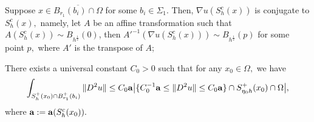 \documentclass[10pt,a4paper]{amsart}
\begin{document}
	\begin{corollary}\label{nonconvpart}
		Suppose $x\in \overline{B_{r_1}(b_i)\cap \Omega}$ for some $b_i\in \Sigma_1.$ Then,
		$\nabla u(S^c_h(x))$ is conjugate to $S^c_h(x),$ namely, let $A$ be an affine transformation such that
		$A\left(S^c_h(x)\right)\sim B_{h^{\frac{1}{2}}}(0)$, then $A'^{-1} \left(\nabla u(S^c_h(x))\right)\sim B_{h^{\frac{1}{2}}}(p)$ for some point $p,$
		where $A'$ is the transpose of $A$;
	\end{corollary}

	\begin{proposition}\label{decay} 
		There exists a universal constant $C_0>0$ such that
		for any $x_0\in \Omega,$ we have
		\begin{equation}\label{decay1}
			\int_{S^+_h(x_0)\cap B^{+}_{r_1}(b_i)}\|D^2u\|\leq C_0{\bf a} \big|\{C_0^{-1}{\bf a}\leq \|D^2u\|\leq C_0{\bf a}\}\cap S^+_{\eta_0 h}(x_0)\cap\Omega\big|,
		\end{equation}
		where ${\bf a}:={\bf a}(S^c_h(x_0)).$
	\end{proposition}
\end{document}
